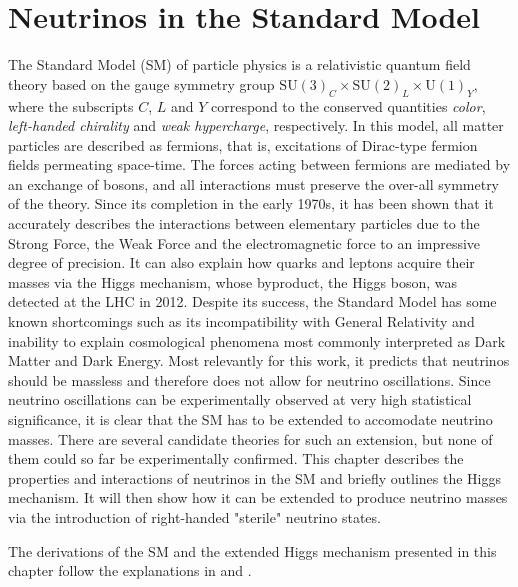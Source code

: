 \setchapterpreamble[u]{\margintoc}

\chapter{Neutrinos in the Standard Model}


The Standard Model (SM) of particle physics is a relativistic quantum field theory based on the gauge symmetry group $\mathrm{SU}(3)_C \times \mathrm{SU}(2)_L \times \mathrm{U}(1)_Y$, where the subscripts $C$, $L$ and $Y$ correspond to the conserved quantities \emph{color}, \emph{left-handed chirality} and \emph{weak hypercharge}, respectively.
In this model, all matter particles are described as fermions, that is, excitations of Dirac-type fermion fields permeating space-time.
The forces acting between fermions are mediated by an exchange of bosons, and all interactions must preserve the over-all symmetry of the theory.
Since its completion in the early 1970s, it has been shown that it accurately describes the interactions between elementary particles due to the Strong Force, the Weak Force and the electromagnetic force to an impressive degree of precision.
It can also explain how quarks and leptons acquire their masses via the Higgs mechanism, whose byproduct, the Higgs boson, was detected at the LHC in 2012\cite{Aad_2012}.
Despite its success, the Standard Model has some known shortcomings such as its incompatibility with General Relativity and inability to explain cosmological phenomena most commonly interpreted as Dark Matter and Dark Energy.
 Most relevantly for this work, it predicts that neutrinos should be massless and therefore does not allow for neutrino oscillations.
Since neutrino oscillations can be experimentally observed at very high statistical significance\cite{PhysRevLett.81.1562}, it is clear that the SM has to be extended to accomodate neutrino masses.
There are several candidate theories for such an extension, but none of them could so far be experimentally confirmed.
This chapter describes the properties and interactions of neutrinos in the SM and briefly outlines the Higgs mechanism.
It will then show how it can be extended to produce neutrino masses via the introduction of right-handed "sterile" neutrino states.

The derivations of the SM and the extended Higgs mechanism presented in this chapter follow the explanations in  and .

